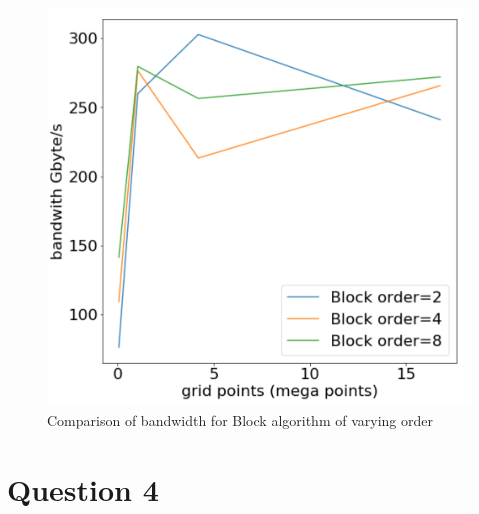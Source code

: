 \begin{figure}[!ht]
	\centering
	\includegraphics[scale=0.5]{graph_block.pdf}
	\caption{Comparison of bandwidth for Block algorithm of varying order}
\end{figure}

\section{Question 4}


